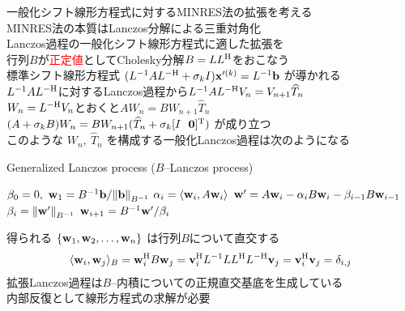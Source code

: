 

一般化シフト線形方程式に対するMINRES法の拡張を考える\\
\myitem MINRES法の本質はLanczos分解による三重対角化\\
\myitem Lanczos過程の一般化シフト線形方程式に適した拡張を\\
行列$B$が\textcolor{red}{正定値}としてCholesky分解$B=LL^{\mathrm{H}}$をおこなう\\
\myitem 標準シフト線形方程式 $(L^{-1}AL^{-\mathrm{H}} + \sigma_{k}I)\vb{x}'^{(k)} = L^{-1}\vb{b}$ が導かれる\\
\myitem $L^{-1}AL^{-\mathrm{H}}$に対するLanczos過程から$L^{-1}AL^{-\mathrm{H}}V_{n} = V_{n+1}\widehat{T}_{n}$\\
\myitem $W_{n} = L^{-\mathrm{H}}V_{n}$とおくと$AW_{n}=BW_{n+1}\widehat{T}_{n}$\\
\myitem $(A+\sigma_{k}B)W_{n}=BW_{n+1}(\widehat{T}_{n} + \sigma_{k}[I \ \  \vb{0}]^{\mathrm{T}})$ が成り立つ\\
このような $W_{n},\ \widehat{T}_{n}$ を構成する一般化Lanczos過程は次のようになる
\vspace{0.2\baselineskip}
\begin{algorithm}[H]
   \caption{ Generalized Lanczos process ($B$--Lanczos process)}
   \label{alg-ex-lanczos}
   \begin{algorithmic}[1]
   	\vspace{-0.4\baselineskip}
   	\State $\beta_0 = 0,\ \vb{w}_1 = B^{-1}\vb{b} / \norm{\vb{b}}_{B^{-1}}$
   		\State $\alpha_i = \langle \vb{w}_i, A\vb{w}_i \rangle$
   		\State $\vb{w}' = A\vb{w}_i - \alpha_i B\vb{w}_i - \beta_{i-1} B \vb{w}_{i-1}$
   		\State $\beta_i = \norm{\vb{w}'}_{B^{-1}}$
   		\State $\vb{w}_{i+1} = B^{-1}\vb{w}' / \beta_i$
   	\EndFor
   \end{algorithmic}
\end{algorithm}

得られる $\{ \vb{w}_{1}, \vb{w}_{2}, \dots, \vb{w}_{n} \}$ は行列$B$について直交する
\begin{align}
	\langle \vb{w}_{i}, \vb{w}_{j} \rangle_{B} = \vb{w}_{i}^{\mathrm{H}} B \vb{w}_{j} = \vb{v}_{i}^{\mathrm{H}} L^{-1} LL^{\mathrm{H}} L^{-\mathrm{H}} \vb{v}_{j} = \vb{v}_{i}^{\mathrm{H}} \vb{v}_{j} = \delta_{i,j}
\end{align}
\myitem 拡張Lanczos過程は$B$--内積についての正規直交基底を生成している\\
\myitem 内部反復として線形方程式の求解が必要


